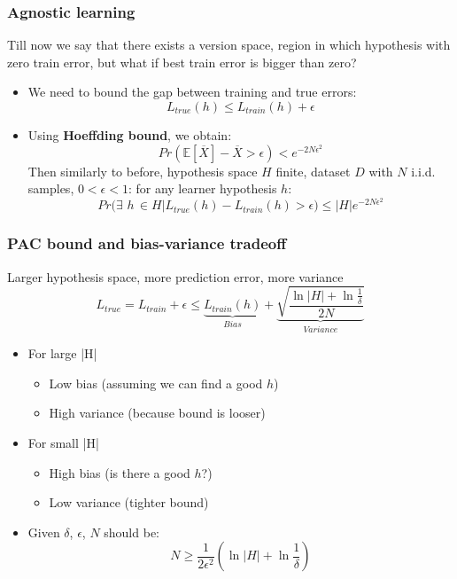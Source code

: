 \subsubsection{Agnostic learning}
    Till now we say that there exists a version space, region in which hypothesis with zero train error, but what if best train error is bigger than zero?
    \begin{itemize}
        \item We need to bound the gap between training and true errors:
        $$L_{true}(h)\leq L_{train}(h)+\epsilon$$
        \item Using \textbf{Hoeffding bound}, we obtain:
        $$Pr(\mathbb{E}[\overline{X}]-\overline{X}>\epsilon)<e^{-2N\epsilon^2}$$
        Then similarly to before, hypothesis space $H$ finite, dataset $D$ with $N$ i.i.d. samples, $0<\epsilon<1$: for any learner hypothesis $h$:
        $$Pr(\exists\,\,h\,\in H|L_{true}(h)-L_{train}(h)>\epsilon)\leq|H|e^{-2N\epsilon^2}$$
    \end{itemize}
\subsubsection{PAC bound and bias-variance tradeoff}
    Larger hypothesis space, more prediction error, more variance
    $$L_{true}=L_{train}+\epsilon\leq\underset{Bias}{\underbrace{L_{train}(h)}}+\underset{Variance}{\underbrace{\sqrt{\frac{\ln|H|+\ln\frac{1}{\delta}}{2N}}}}$$
    \begin{itemize}
        \item For large |H|
        \begin{itemize}
            \item Low bias (assuming we can find a good $h$)
            \item High variance (because bound is looser)
        \end{itemize}
        \item For small |H|
        \begin{itemize}
            \item High bias (is there a good $h$?)
            \item Low variance (tighter bound)
        \end{itemize}
        \item Given $\delta$, $\epsilon$, $N$ should be:
        $$N\geq\frac{1}{2\epsilon^2}\left(\ln|H|+\ln\frac{1}{\delta}\right)$$
    \end{itemize}

